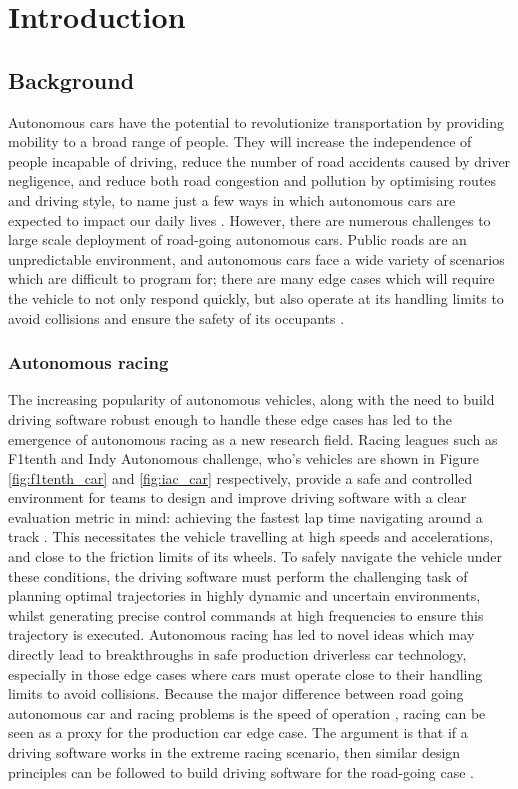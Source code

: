 \chapter{Introduction}
\label{chp:introduction}


\section{Background}
\label{sec:background}

Autonomous cars have the potential to revolutionize transportation by providing mobility to a broad range of people. 
They will increase the independence of people incapable of driving, reduce the number of road accidents caused by driver negligence, and reduce both road congestion and pollution by optimising routes and driving style, to name just a few ways in which autonomous cars are expected to impact our daily lives \cite{klaver}. 
However, there are numerous challenges to large scale deployment of road-going autonomous cars. 
Public roads are an unpredictable environment, and autonomous cars face a wide variety of scenarios which are difficult to program for; 
there are many edge cases which will require the vehicle to not only respond quickly, but also operate at its handling limits to avoid collisions and ensure the safety of its occupants \cite{Barab_s_2017}.

\subsection{Autonomous racing}
The increasing popularity of autonomous vehicles, along with the need to build driving software robust enough to handle these edge cases has led to the emergence of autonomous racing as a new research field. 
Racing leagues such as F1tenth and Indy Autonomous challenge, who's vehicles are shown in Figure \ref{fig:f1tenth_car} and \ref{fig:iac_car} respectively, provide a safe and controlled environment for teams to design and improve driving software with a clear evaluation metric in mind: achieving the fastest lap time navigating around a track \cite{Betz2021}. 
This necessitates the vehicle travelling at high speeds and accelerations, and close to the friction limits of its wheels.
To safely navigate the vehicle under these conditions, the driving software must perform the challenging task of planning optimal trajectories in highly dynamic and uncertain environments, whilst generating precise control commands at high frequencies to ensure this trajectory is executed.
Autonomous racing has led to novel ideas which may directly lead to breakthroughs in safe production driverless car technology, especially in those edge cases where cars must operate close to their handling limits to avoid collisions.
Because the major difference between road going autonomous car and racing problems is the speed of operation \cite{Wadekar2021}, racing can be seen as a proxy for the production car edge case. 
The argument is that if a driving software works in the extreme racing scenario, then similar design principles can be followed to build driving software for the road-going case \cite{Weiss2020a}.

